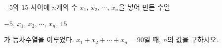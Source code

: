 $-5$와 $15$ 사이에 $n$개의 수 $x_1$, $x_2$, $\cdots$, $x_n$을 넣어 만든 수열 \par\smallskip\noindent\hspace*{1.5em}$-5$, $x_1$, $x_2$, $\cdots$, $x_n$, $15$\par\smallskip\noindent 가 등차수열을 이루었다. $x_1+x_2+\cdots+x_n=90$일 때, $n$의 값을 구하시오.
